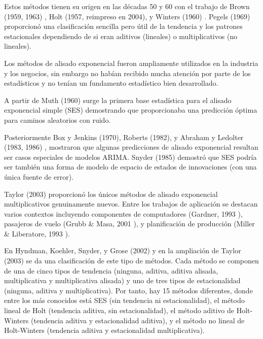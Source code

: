 \documentclass{llncs}
\begin{document}
Estos métodos tienen su origen en las décadas 50 y 60 con el trabajo de Brown (1959, 1963) \cite{Brown1959} \cite{Brown1963}, Holt (1957, reimpreso en 2004)\cite{Holt20045}, y Winters (1960) \cite{Winters1960324}. Pegels (1969) \cite{Pegels1969311} proporcionó una clasificación sencilla pero útil de la tendencia y los patrones estacionales dependiendo de si eran aditivos (lineales)  o multiplicativos (no lineales).

Los métodos de alisado exponencial fueron ampliamente utilizados en la industria y los negocios, sin embargo no habían recibido mucha atención por parte de los estadísticos y no tenían un fundamento estadístico bien desarrollado. 

A partir de Muth (1960) \cite{Muth1960299}  surge la primera base estadística para el alisado exponencial simple (SES) demostrando que proporcionaba una predicción óptima para caminos aleatorios con ruido. 

Posteriormente Box y Jenkins (1970), Roberts (1982)\cite{Roberts1982808}, y Abraham y Ledolter (1983, 1986) \cite{Abraham1983}\cite{Abraham198651}, mostraron que algunas predicciones de alisado exponencial resultan ser casos especiales de modelos ARIMA. Snyder (1985) \cite{Snyder1985272} demostró que SES podría ser también una forma de modelo de espacio de estados de innovaciones (con una única fuente de error). 

Taylor (2003)\cite{Taylor2003715} proporcionó los únicos métodos de alisado exponencial multiplicativos genuinamente nuevos. Entre los trabajos de aplicación se destacan varios contextos incluyendo componentes de computadores (Gardner, 1993 \cite{GardnerJr1993245}), pasajeros de vuelo (Grubb \& Masa, 2001 \cite{Grubb200171}), y planificación de producción (Miller \& Liberatore, 1993 \cite{Miller1993509}).

En Hyndman, Koehler, Snyder, y Grose (2002) \cite{Hyndman2002439} y en la ampliación de Taylor (2003) \cite{Taylor2003715} se da una clasificación de este tipo de métodos. Cada método se componen de una de cinco tipos de tendencia (ninguna, aditiva, aditiva alisada, multiplicativa y multiplicativa alisada) y uno de tres tipos de estacionalidad (ninguna, aditiva y multiplicativa). Por tanto, hay 15 métodos diferentes, donde entre los más conocidos está SES (sin tendencia ni estacionalidad), el método lineal de Holt (tendencia aditiva, sin estacionalidad), el método aditivo de Holt-Winters (tendencia aditiva y estacionalidad aditiva), y el método no lineal de Holt-Winters (tendencia aditiva y estacionalidad multiplicativa).
\end{document}

